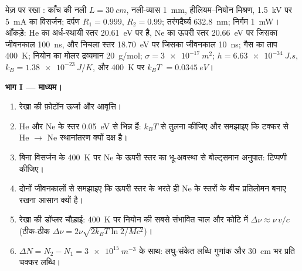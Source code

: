 \begin{problem}\label{pb:b2:laser:1}
मेज़ पर रखा : काँच की नली $L = \qty{30}{cm}$, नली-व्यास
\qty{1}{mm}, हीलियम--नियोन मिश्रण, \qty{1.5}{kV} पर \qty{5}{mA} का
विसर्जन; दर्पण $R_1 = 0.999$, $R_2 = 0.99$; तरंगदैर्घ्य
\qty{632.8}{nm}; निर्गम \qty{1}{mW}। आँकड़े: He का अर्ध-स्थायी स्तर
\qty{20.61}{eV} पर है, Ne का ऊपरी  स्तर \qty{20.66}{eV} पर जिसका
जीवनकाल \qty{100}{ns}, और निचला  स्तर \qty{18.70}{eV} पर जिसका
जीवनकाल \qty{10}{ns}; गैस का ताप \qty{400}{K}; नियोन का मोलर द्रव्यमान
\qty{20}{g/mol};  $\sigma = \qty{3e-17}{m^2}$; $h =
\qty{6.63e-34}{J.s}$, $k_B = \qty{1.38e-23}{J/K}$, और \qty{400}{K} पर $k_BT$
$= \qty{0.0345}{eV}$।

\textbf{भाग I --- माध्यम।}
\begin{enumerate}
  \item {} रेखा की फ़ोटॉन ऊर्जा और आवृत्ति।
  \item He और Ne के स्तर \qty{0.05}{eV} से भिन्न हैं: $k_BT$ से
        तुलना कीजिए और समझाइए कि टक्कर से He $\to$ Ne स्थानांतरण
        क्यों दक्ष है।
  \item बिना विसर्जन के \qty{400}{K} पर Ne के ऊपरी स्तर का भू-अवस्था से
        बोल्ट्समान अनुपात: टिप्पणी कीजिए।
  \item दोनों जीवनकालों से समझाइए कि ऊपरी स्तर के भरते ही Ne के
        स्तरों के बीच प्रतिलोमन बनाए रखना आसान क्यों है।
  \item रेखा की डॉप्लर चौड़ाई: \qty{400}{K} पर नियोन की सबसे संभावित
        चाल और कोटि में $\Delta\nu \approx \nu\,v/c$
        (ठीक-ठीक $\Delta\nu = 2\nu\sqrt{2k_BT\ln2/Mc^2}$)।
  \item $\Delta N = N_2 - N_1 = \qty{3e15}{m^{-3}}$ के साथ: लघु-संकेत
        लब्धि गुणांक और \qty{30}{cm} भर प्रति चक्कर लब्धि।
\end{enumerate}


\end{problem}
